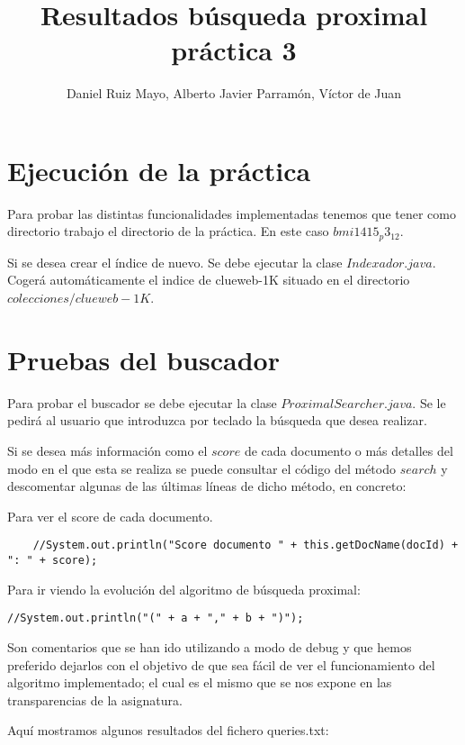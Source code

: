 \documentclass[palatino,nochap]{apuntes}
\title{Resultados búsqueda proximal práctica 3}
\author{Daniel Ruiz Mayo, Alberto Javier Parramón, Víctor de Juan}
\date{}
\begin{document}
\pagestyle{plain}
\maketitle



\section{Ejecución de la práctica}
Para probar las distintas funcionalidades implementadas tenemos que tener como directorio trabajo el directorio de la práctica. En este caso $bmi1415_p3_12$.

Si se desea crear el índice de nuevo. Se debe ejecutar la clase $Indexador.java$. Cogerá automáticamente el indice de clueweb-1K situado en el directorio $colecciones/clueweb-1K$.

\section{Pruebas del buscador}

Para probar el buscador se debe ejecutar la clase $ProximalSearcher.java$. Se le pedirá al usuario que introduzca por teclado la búsqueda que desea realizar.

Si se desea más información como el $score$ de cada documento o más detalles del modo en el que esta se realiza se puede consultar el código del método $search$ y descomentar algunas de las últimas líneas de dicho método, en concreto:

Para ver el score de cada documento.
\begin{verbatim}
	//System.out.println("Score documento " + this.getDocName(docId) + ": " + score);
\end{verbatim}

Para ir viendo la evolución del algoritmo de búsqueda proximal:
\begin{verbatim}
//System.out.println("(" + a + "," + b + ")");
\end{verbatim}

Son comentarios que se han ido utilizando a modo de debug y que hemos preferido dejarlos con el objetivo de que sea fácil de ver el funcionamiento del algoritmo implementado; el cual es el mismo que se nos expone en las transparencias de la asignatura.

Aquí mostramos algunos resultados del fichero queries.txt:
\end{document}
